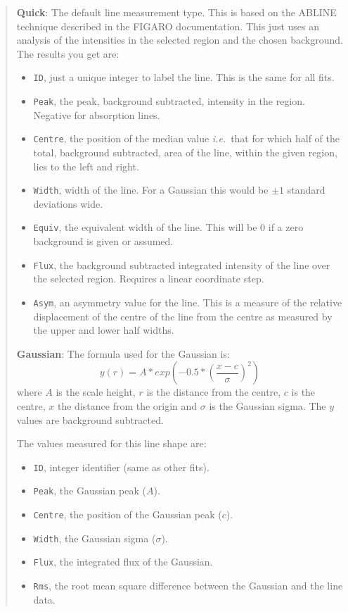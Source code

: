 \documentclass[twoside,11pt]{article}
\newcommand{\xref}[3]{#1}
\renewcommand{\_}{\texttt{\symbol{95}}}
\newcommand{\labelitem}[1]{\textbf{#1}}
\newcommand{\hitext}[1]{\texttt{#1}}
\newcommand{\ie}{\textit{i.e.}}
\begin{document}
\begin{quote}
 \labelitem{Quick}: The default line measurement type. This is based on
 the ABLINE technique described in the \xref{FIGARO}{sun86}{}
 documentation. This just uses an analysis of the intensities in the
 selected region and the chosen background. The results you get are:
 \begin{itemize}
   \item \hitext{ID}, just a unique integer to label the line. This is
         the same for all fits.
   \item \hitext{Peak}, the peak, background subtracted, intensity in
         the region. Negative for absorption lines.
   \item \hitext{Centre}, the position of the median value \ie\ that
         for which half of the total, background subtracted, area of
         the line, within the given region, lies to the left and right.
   \item \hitext{Width}, width of the line. For a Gaussian this would
         be $\pm 1$ standard deviations wide.
   \item \hitext{Equiv}, the equivalent width of the line. This will be
         $0$ if a zero background is given or assumed.
   \item \hitext{Flux}, the background subtracted integrated intensity
         of the line over the selected region. Requires a linear
         coordinate step.
   \item \hitext{Asym}, an asymmetry value for the line. This is a
         measure of the relative displacement of the centre of the
         line from the centre as measured by the upper and lower
         half widths.
 \end{itemize}

 \labelitem{Gaussian}: The formula used for the Gaussian is:
 \[
  y(r) = A * exp\left( -0.5 * \left(\frac{x-c}{\sigma}\right)^{2}\right)
 \]
 where $A$ is the scale height, $r$ is the distance from the centre,
 $c$ is the centre, $x$ the distance from the origin and $\sigma$ is
 the Gaussian sigma. The $y$ values are background subtracted.

 The values measured for this line shape are:
 \begin{itemize}
   \item \hitext{ID}, integer identifier (same as other fits).
   \item \hitext{Peak}, the Gaussian peak ($A$).
   \item \hitext{Centre}, the position of the Gaussian peak ($c$).
   \item \hitext{Width}, the Gaussian sigma ($\sigma$).
   \item \hitext{Flux}, the integrated flux of the Gaussian.
   \item \hitext{Rms}, the root mean square difference between the
         Gaussian and the line data.
 \end{itemize}


\end{quote}
\end{document}
